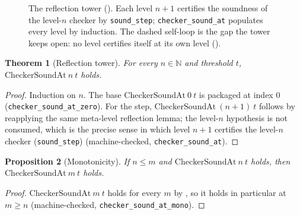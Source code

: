 \documentclass[11pt,a4paper]{article}
\newtheorem{theorem}{Theorem}[section]
\newtheorem{proposition}[theorem]{Proposition}
\newcommand{\Nat}{\mathbb{N}}
\begin{document}
\begin{figure}[t]
\centering
{}
\caption{The reflection tower ().
Each level $n+1$ certifies the soundness of the level-$n$ checker by
\texttt{sound\_step}; \texttt{checker\_sound\_at} populates every level by
induction. The dashed self-loop is the gap the tower keeps open: no level
certifies itself at its own level ().}
\label{fig:tower}
\end{figure}

\begin{theorem}[Reflection tower]
\label{thm:tower}
For every $n \in \Nat$ and threshold $t$, $\mathrm{CheckerSoundAt}\ n\ t$ holds.
\end{theorem}

\begin{proof}
Induction on $n$.
The base $\mathrm{CheckerSoundAt}\ 0\ t$ is  packaged at
index $0$ (\texttt{checker\_sound\_at\_zero}).
For the step, $\mathrm{CheckerSoundAt}\ (n+1)\ t$ follows by reapplying the same
meta-level reflection lemma; the level-$n$ hypothesis is not consumed, which is
the precise sense in which level $n+1$ certifies the level-$n$ checker
(\texttt{sound\_step})
(machine-checked, \texttt{checker\_sound\_at}).
\end{proof}

\begin{proposition}[Monotonicity]
\label{prop:tower-mono}
If $n \le m$ and $\mathrm{CheckerSoundAt}\ n\ t$ holds, then
$\mathrm{CheckerSoundAt}\ m\ t$ holds.
\end{proposition}

\begin{proof}
$\mathrm{CheckerSoundAt}\ m\ t$ holds for every $m$ by ,
so it holds in particular at $m \ge n$
(machine-checked, \texttt{checker\_sound\_at\_mono}).
\end{proof}
\end{document}
